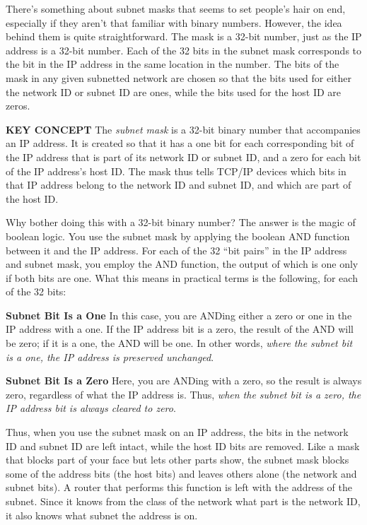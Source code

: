 There's something about subnet
masks that
seems to set people's hair on end, especially if they aren't that
familiar with binary numbers. However, the idea behind them is quite
straightforward. The mask is a 32-bit number, just as the IP address is
a 32-bit number. Each of the 32 bits in the
subnet mask
corresponds to the bit in the IP address in the same location in the
number. The bits of the mask in any given subnetted network are chosen
so that the bits used for either the network ID or subnet ID are ones,
while the bits used for the host ID are zeros.


{\textbf{KEY CONCEPT}} The {\emph{subnet mask}} is a 32-bit binary
number that accompanies an IP address. It is created so that it has a
one bit for each corresponding bit of the IP address that is part of its
network ID or subnet ID, and a zero for each bit of the IP address's
host ID. The mask thus tells TCP/IP devices which bits in that IP
address belong to the network ID and subnet ID, and which are part of
the host ID.

Why bother doing this with a 32-bit binary number? The answer is the
magic of boolean logic. You use the subnet mask by applying the boolean
AND function between it and the IP address. For each of the 32 ``bit
pairs'' in the IP address and subnet mask, you employ the AND function,
the output of which is one only if both bits are one. What this means in
practical terms is the following, for each of the 32 bits:

{\textbf{Subnet Bit Is a One}} In this case, you are ANDing either a
zero or one in the IP address with a one. If the IP address bit is a
zero, the result of the AND will be zero; if it is a one, the AND will
be one. In other words, {\emph{where the subnet bit is a one, the IP
address is preserved unchanged}}.

{\textbf{Subnet Bit Is a Zero}} Here, you are ANDing with a zero, so the
result is always zero, regardless of what the IP address is. Thus,
{\emph{when the subnet bit is a zero, the IP address bit is always
cleared to zero}}.

Thus, when you use the subnet mask on an IP address, the bits in the
network ID and subnet ID are left intact, while the host ID bits are
removed. Like a mask that blocks part of your face but lets other parts
show, the subnet mask blocks some of the address bits (the host bits)
and leaves others alone (the network and subnet bits). A router that
performs this function is left with the address of the subnet. Since it
knows from the class of the network what part is the network ID, it also
knows what subnet the address is on.


